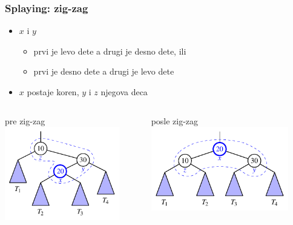 \documentclass[compress]{beamer}
\begin{document}
\begin{frame}[fragile]
  \frametitle{Splaying: zig-zag}
  \begin{itemize}
    \item $x$ i $y$ 
    \begin{itemize}
      \item prvi je levo dete a drugi je desno dete, ili
      \item prvi je desno dete a drugi je levo dete
    \end{itemize}
    \item $x$ postaje koren, $y$ i $z$ njegova deca
  \end{itemize}
  \begin{columns}
    \begin{column}[t]{6cm}
      \begin{center}
        pre zig-zag 
        \includegraphics[width=5cm]{asp-11-pic19a.pdf}
      \end{center}
    \end{column}  
    \begin{column}[t]{6cm}
      \begin{center}
        posle zig-zag
        \includegraphics[width=6cm]{asp-11-pic19b.pdf}
      \end{center}
    \end{column}  
  \end{columns}
\end{frame}
\end{document}
